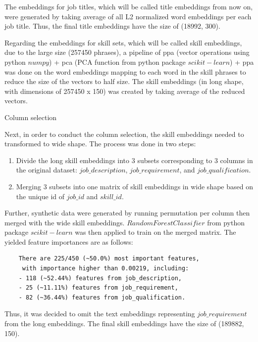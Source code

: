 \documentclass[a4paper,man,floatsintext,natbib,noextraspace]{apa6}
\makeatletter
\renewcommand{\subsection}{\@startsection{subsection}{2}
  {\z@}
  {\b@level@two@skip}
  {\e@level@two@skip}
  {\normalfont\normalsize\bfseries}}
\makeatother
\begin{document}
The embeddings for job titles, which will be called title embeddings from now on, were generated by taking average of all L2 normalized word embeddings per each job title. Thus, the final title embeddings have the size of (18992, 300). 

Regarding the embeddings for skill sets, which will be called skill embeddings, due to the large size (257450 phrases), a pipeline of \gls{ppa} (vector operations using python $numpy$) + \gls{pca} (PCA function from python package $scikit-learn$) + \gls{ppa} was done on the word embeddings mapping to each word in the skill phrases to reduce the size of the vectors to half size. The skill embeddings (in long shape, with dimensions of 257450 x 150) was created by taking average of the reduced vectors.

\subsection{Column selection}

Next, in order to conduct the column selection, the skill embeddings needed to transformed to wide shape. The process was done in two steps:

\begin{enumerate}
    \item Divide the long skill embeddings into 3 subsets corresponding to 3 columns in the original dataset: $job\_description$, $job\_requirement$, and $job\_qualification$.
    \item Merging 3 subsets into one matrix of skill embeddings in wide shape based on the unique id of $job\_id$ and $skill\_id$. 
\end{enumerate}

Further, synthetic data were generated by running permutation per column then merged with the wide skill embeddings. $RandomForestClassifier$ from python package $scikit-learn$ was then applied to train on the merged matrix. The yielded feature importances are as follows:

\begin{verbatim}
    There are 225/450 (~50.0%) most important features,
     with importance higher than 0.00219, including: 
    - 118 (~52.44%) features from job_description, 
    - 25 (~11.11%) features from job_requirement, 
    - 82 (~36.44%) features from job_qualification.
\end{verbatim}

Thus, it was decided to omit the text embeddings representing $job\_requirement$ from the long embeddings. The final skill embeddings have the size of (189882, 150).
\end{document}
